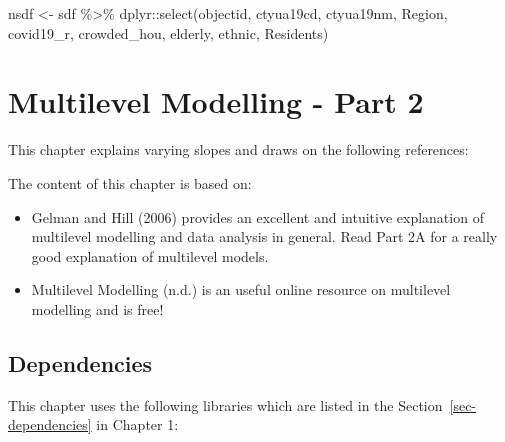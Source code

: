 \documentclass[
  letterpaper,
  DIV=11,
  numbers=noendperiod,
  oneside]{scrreprt}
\newenvironment{Shaded}{\begin{snugshade}}{\end{snugshade}}
\newcommand{\FunctionTok}[1]{\textcolor[rgb]{0.28,0.35,0.67}{#1}}
\newcommand{\NormalTok}[1]{\textcolor[rgb]{0.00,0.23,0.31}{#1}}
\newcommand{\OtherTok}[1]{\textcolor[rgb]{0.00,0.23,0.31}{#1}}
\newcommand{\SpecialCharTok}[1]{\textcolor[rgb]{0.37,0.37,0.37}{#1}}
\begin{document}
\begin{Shaded}
\begin{Highlighting}[]
\NormalTok{nsdf }\OtherTok{\textless{}{-}}\NormalTok{ sdf  }\SpecialCharTok{\%\textgreater{}\%}\NormalTok{  dplyr}\SpecialCharTok{::}\FunctionTok{select}\NormalTok{(objectid, }
\NormalTok{                         ctyua19cd, }
\NormalTok{                         ctyua19nm, }
\NormalTok{                         Region, }
\NormalTok{                         covid19\_r, }
\NormalTok{                         crowded\_hou, }
\NormalTok{                         elderly, }
\NormalTok{                         ethnic, }
\NormalTok{                         Residents)}
\end{Highlighting}
\end{Shaded}


\chapter{Multilevel Modelling - Part 2}\label{sec-chp8}

This chapter explains varying slopes and draws on the following
references:

The content of this chapter is based on:

\begin{itemize}
\item
  Gelman and Hill (2006) provides an excellent and intuitive explanation
  of multilevel modelling and data analysis in general. Read Part 2A for
  a really good explanation of multilevel models.
\item
  Multilevel Modelling (n.d.) is an useful online resource on multilevel
  modelling and is free!
\end{itemize}

\section{Dependencies}\label{dependencies-5}

This chapter uses the following libraries which are listed in the
Section~\ref{sec-dependencies} in Chapter 1:
\end{document}
